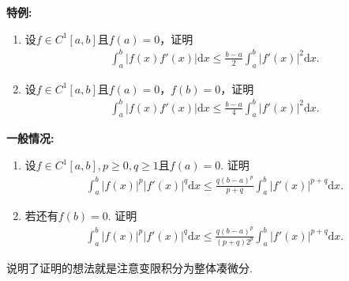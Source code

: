 \documentclass[../../main.tex]{subfiles}%
\begin{document}
\begin{example}[$\,\,$opial不等式]\label{example:opial不等式}

\textbf{特例:}
\begin{enumerate}
\item 设\(f \in C^1[a,b]\)且\(f(a) = 0\)，证明
\begin{align*}
\int_{a}^{b}|f(x)f'(x)|\mathrm{d}x \leqslant \frac{b - a}{2}\int_{a}^{b}|f'(x)|^{2}\mathrm{d}x.
\end{align*}

\item 设\(f \in C^1[a,b]\)且\(f(a) = 0\)，\(f(b) = 0\)，证明
\begin{align*}
\int_{a}^{b}|f(x)f'(x)|\mathrm{d}x \leqslant \frac{b - a}{4}\int_{a}^{b}|f'(x)|^{2}\mathrm{d}x.
\end{align*} 
\end{enumerate}

\textbf{一般情况:}
\begin{enumerate}
\item 设\(f \in C^1[a,b], p\geqslant0, q\geqslant1\)且\(f(a) = 0\). 证明
\begin{align}
\int_{a}^{b}|f(x)|^{p}|f'(x)|^{q}\mathrm{d}x \leqslant \frac{q(b - a)^{p}}{p + q}\int_{a}^{b}|f'(x)|^{p + q}\mathrm{d}x. \label{equation----:::16.37}
\end{align}

\item 若还有\(f(b) = 0\). 证明
\begin{align}
\int_{a}^{b}|f(x)|^{p}|f'(x)|^{q}\mathrm{d}x \leqslant \frac{q(b - a)^{p}}{(p + q)2^{p}}\int_{a}^{b}|f'(x)|^{p + q}\mathrm{d}x. \label{equation----:::16.38}
\end{align}
\end{enumerate}
\end{example}
\begin{note}
说明了证明的想法就是注意变限积分为整体凑微分.
\end{note}
\end{document}
